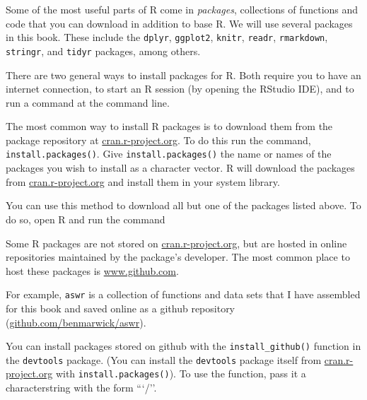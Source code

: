 Some of the most useful parts of R come in \emph{packages}, collections
of functions and code that you can download in addition to base R. We
will use several packages in this book. These include the
\texttt{dplyr}, \texttt{ggplot2}, \texttt{knitr}, \texttt{readr},
\texttt{rmarkdown}, \texttt{stringr}, and \texttt{tidyr} packages, among
others.

There are two general ways to install packages for R. Both require you
to have an internet connection, to start an R session (by opening the
RStudio IDE), and to run a command at the command line.

The most common way to install R packages is to download them from the
package repository at
\href{http://cran.r-project.org}{cran.r-project.org}. To do this run the
command, \texttt{install.packages()}. Give \texttt{install.packages()}
the name or names of the packages you wish to install as a character
vector. R will download the packages from
\href{http://cran.r-project.org}{cran.r-project.org} and install them in
your system library.

You can use this method to download all but one of the packages listed
above. To do so, open R and run the command

\begin{Shaded}
\begin{Highlighting}[]
\NormalTok{(}\NormalTok{(}\NormalTok{, }\NormalTok{, }\NormalTok{, }
                   \NormalTok{, }\NormalTok{, }\NormalTok{, }
                   \NormalTok{, }\NormalTok{, }\NormalTok{))}
\end{Highlighting}
\end{Shaded}

Some R packages are not stored on
\href{http://cran.r-project.org}{cran.r-project.org}, but are hosted in
online repositories maintained by the package's developer. The most
common place to host these packages is
\href{http://www.github.com}{www.github.com}.

For example, \texttt{aswr} is a collection of functions and data sets
that I have assembled for this book and saved online as a github
repository
(\href{http://github.com/benmarwick/aswr}{github.com/benmarwick/aswr}).

You can install packages stored on github with the
\texttt{install\_github()} function in the \texttt{devtools} package.
(You can install the \texttt{devtools} package itself from
\href{http://cran.r-project.org}{cran.r-project.org} with
\texttt{install.packages()}). To use the function, pass it a
characterstring with the form ```/''.

